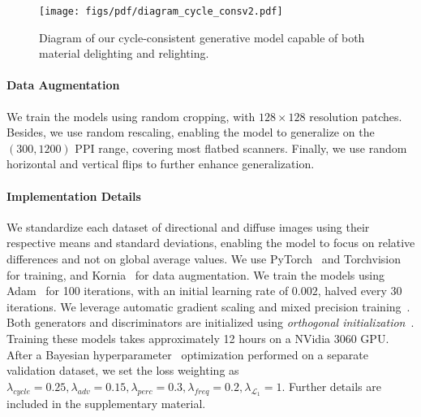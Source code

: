 \begin{figure*}[tb]
	\centering
	\texttt{[image: figs/pdf/diagram\_cycle\_consv2.pdf]}
	\caption{Diagram of our cycle-consistent generative model capable of both material delighting and relighting. }
	\label{fig:delighting_diagram}
\end{figure*}


\paragraph*{\textbf{Data Augmentation}} We train the models using random cropping, with $128\times128$ resolution patches. Besides, we use random rescaling, enabling the model to generalize on the $(300, 1200)$ PPI range, covering most flatbed scanners. Finally, we use random horizontal and vertical flips to further enhance generalization. 

\paragraph*{\textbf{Implementation Details}} We standardize each dataset of directional and diffuse images using their respective means and standard deviations, enabling the model to focus on relative differences and not on global average values. We use PyTorch~\cite{paszke2017automatic} and Torchvision~\cite{marcel2010torchvision} for training, and Kornia~\cite{riba2020kornia} for data augmentation. We train the models using Adam~\cite{kingma2014adam} for 100 iterations, with an initial learning rate of $0.002$, halved every 30 iterations. We leverage automatic gradient scaling and mixed precision training~\cite{micikevicius2017mixed}. Both generators and discriminators are initialized using \emph{orthogonal initialization}~\cite{hu2020provable}. Training these models takes approximately 12 hours on a NVidia 3060 GPU. After a Bayesian hyperparameter~\cite{wandb} optimization performed on a separate validation dataset, we set the loss weighting as $\lambda_{cycle} = 0.25, \lambda_{adv} = 0.15, \lambda_{perc} = 0.3, \lambda_{freq} = 0.2, \lambda_{\mathcal{L}_1} = 1$. Further details are included in the supplementary material. 
